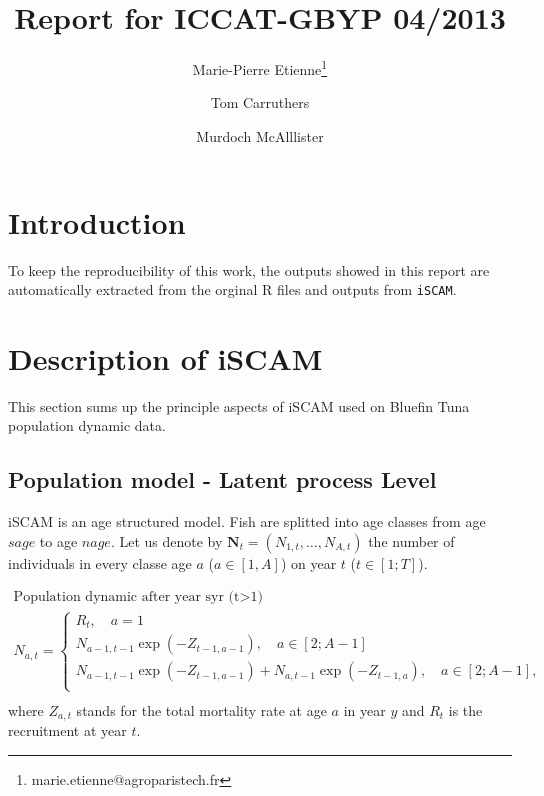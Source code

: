 \documentclass[a4paper]{article}\usepackage{graphicx, color}
\title{Report for ICCAT-GBYP 04/2013}
\author[1]{Marie-Pierre Etienne\thanks{marie.etienne@agroparistech.fr}}
\author[2]{Tom Carruthers }
\author[2]{Murdoch McAlllister}
\affil[1]{AgroParisTech}
\affil[2]{UBC}
\newcommand{\ASS}[1]{\par \textcolor{blue}{ASSUMPTION : #1}\par}
\newcommand{\iscam}{\texttt{iSCAM}}
\newcommand{\Nt}{\boldsymbol N_t}
\begin{document}
\graphicspath{{/home/metienne/ICCAT/ICCAT-BFT/Report/}}
 






\maketitle
\section{Introduction}


To keep  the reproducibility of  this work,  the outputs showed  in this
report  are  automatically extracted  from  the  orginal R  files  and
outputs from \iscam.




\section{Description of iSCAM}
This section  sums up the principle  aspects of iSCAM used  on Bluefin
Tuna population dynamic data.
\subsection{Population model - Latent process Level}
iSCAM is an age structured model.  Fish are splitted into age classes from
age $sage$ to age $nage$. Let us denote by $\Nt = (N_{1,t}, \ldots, N_{A,t})$ the number
of individuals in every classe age $a$ ($a\in [1,A]$) on year $t$ ($t\in [1;T]$).

\begin{gather}
  \mbox{Population dynamic after year syr (t>1)}\\
  N_{a,t}= \left\lbrace 
    \begin{array}{l}
      R_t, \quad a=1\\
      N_{a-1,t-1} \exp(-Z_{t-1, a-1}), \quad a\in [2;A-1]\\
      N_{a-1,t-1} \exp(-Z_{t-1, a-1}) + N_{a,t-1} \exp(-Z_{t-1, a}), \quad a\in [2;A-1],\\
    \end{array}  \right. \\
\end{gather}
 where $Z_{a,t}$  stands for the total  mortality rate at age  $a$ in
  year $y$ and $R_t$ is the recruitment at year $t$.


\end{document}
